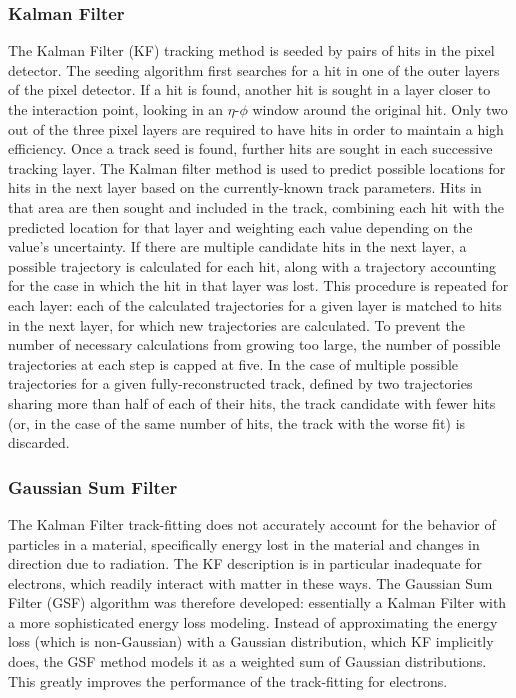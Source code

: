 \subsubsection{Kalman Filter}
\label{evReco:KF}
The Kalman Filter (KF) tracking method is seeded 
by pairs of hits in the pixel detector.  
The seeding algorithm first searches for a hit 
in one of the outer layers of the pixel detector.  
If a hit is found, another hit is sought in a 
layer closer to the interaction point, 
looking in an $\eta$-$\phi$ window around 
the original hit.  
Only two out of the three pixel layers are 
required to have hits 
in order to maintain a high efficiency.  
Once a track seed is found, 
further hits are sought in each successive tracking layer. 
The Kalman filter method is used to predict possible 
locations for hits in the next layer based on 
the currently-known track parameters.%
Hits in that area are then sought and included 
in the track, combining each hit with the 
predicted location for that layer and weighting 
each value depending on the value's uncertainty.  
If there are multiple candidate hits in the next layer, 
a possible trajectory is calculated for each hit, 
along with a trajectory accounting for the case 
in which the hit in that layer was lost.  
This procedure is repeated for each layer: 
each of the calculated trajectories for a given layer 
is matched to hits in the next layer, 
for which new trajectories are calculated.  
To prevent the number of necessary calculations 
from growing too large, 
the number of possible trajectories at each step 
is capped at five.  
In the case of multiple possible trajectories 
for a given fully-reconstructed track, 
defined by two trajectories sharing more than 
half of each of their hits,
the track candidate with fewer hits 
(or, in the case of the same number of hits, 
the track with the worse fit)
is discarded.  

\subsubsection{Gaussian Sum Filter}
\label{evReco:GSF}

The Kalman Filter track-fitting does not accurately 
account for the behavior of particles in a material, 
specifically energy lost in the material 
and changes in direction due to radiation.  
The KF description is in particular inadequate 
for electrons, which 
readily interact with matter in these ways.  
The Gaussian Sum Filter (GSF) algorithm was 
therefore developed:
essentially a Kalman Filter 
with a more sophisticated energy loss modeling.   
Instead of approximating the energy loss 
(which is non-Gaussian)
with a Gaussian distribution, 
which KF implicitly does, 
the GSF method models it as a 
weighted sum of Gaussian distributions.  
This greatly improves the performance 
of the track-fitting for electrons.  

